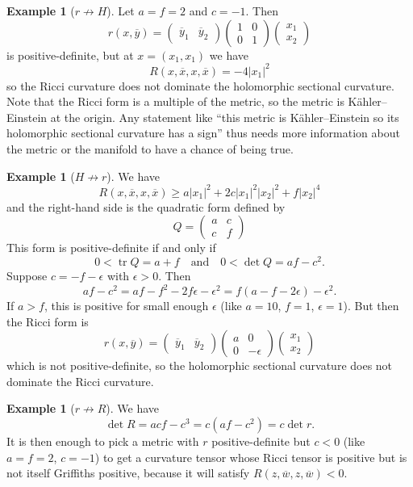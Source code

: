 \documentclass[10pt,a4paper]{amsart}
\theoremstyle{definition}
\newtheorem{exam}[theo]{Example}
\def\ov#1{\overline{#1}}
\def\qandq{\quad\text{and}\quad}
\DeclareMathOperator{\tr}{tr}
\begin{document}
\begin{exam}[$r \not\to H$]
Let $a = f = 2$ and $c = -1$. Then
$$
r(x, \ov y) =
\begin{pmatrix}\ov y_1 & \ov y_2 \end{pmatrix}
\begin{pmatrix}
1 & 0 \\ 0 & 1
\end{pmatrix}
\begin{pmatrix} x_1 \\ x_2 \end{pmatrix}
$$
is positive-definite, but at $x = (x_1, x_1)$ we have
$$
R(x, \ov x, x, \ov x) = -4 |x_1|^2
$$
so the Ricci curvature does not dominate the holomorphic sectional curvature.
Note that the Ricci form is a multiple of the metric, so the metric is
K\"ahler--Einstein at the origin.
Any statement like ``this metric is K\"ahler--Einstein so its holomorphic
sectional curvature has a sign'' thus needs more information about the metric
or the manifold to have a chance of being true.
\end{exam}

\begin{exam}[$H \not\to r$]
We have
$$
R(x, \ov x, x, \ov x)
\geq
a |x_1|^2 + 2c |x_1|^2 |x_2|^2 + f |x_2|^4
$$
and the right-hand side is the quadratic form defined by
$$
Q = \begin{pmatrix}
a & c \\ c & f
\end{pmatrix}
$$
This form is positive-definite if and only if
$$
0 < \tr Q = a + f
\qandq
0 < \det Q = af - c^2.
$$
Suppose $c = -f - \epsilon$ with $\epsilon > 0$.
Then
$$
af - c^2
= af - f^2 - 2f \epsilon - \epsilon^2
= f(a - f - 2\epsilon) - \epsilon^2.
$$
If $a > f$, this is positive for small enough $\epsilon$ (like $a = 10$, $f =
1$, $\epsilon = 1$).
But then the Ricci form is
$$
r(x, \ov y) =
\begin{pmatrix}\ov y_1 & \ov y_2 \end{pmatrix}
\begin{pmatrix}
a & 0 \\ 0 & -\epsilon
\end{pmatrix}
\begin{pmatrix} x_1 \\ x_2 \end{pmatrix}
$$
which is not positive-definite,
so the holomorphic sectional curvature does not dominate the Ricci
curvature.
\end{exam}

\begin{exam}[$r \not\to R$]
We have
$$
\det R = acf - c^3 = c(af - c^2) = c \det r.
$$
It is then enough to pick a metric with $r$ positive-definite but $c < 0$
(like $a = f = 2$, $c = -1$)
to get a curvature tensor whose Ricci tensor is positive but is not itself
Griffiths positive, because it will satisfy $R(z, \ov w, z, \ov w) < 0$.
\end{exam}
\end{document}
